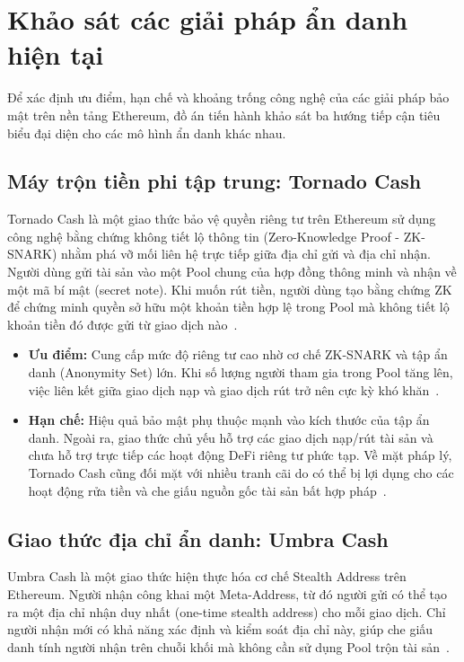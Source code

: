 \documentclass[../DoAn.tex]{subfiles}
\begin{document}
\section{Khảo sát các giải pháp ẩn danh hiện tại}
Để xác định ưu điểm, hạn chế và khoảng trống công nghệ của các giải pháp bảo mật trên nền tảng Ethereum, đồ án tiến hành khảo sát ba hướng tiếp cận tiêu biểu đại diện cho các mô hình ẩn danh khác nhau.

\subsection{Máy trộn tiền phi tập trung: Tornado Cash}

Tornado Cash là một giao thức bảo vệ quyền riêng tư trên Ethereum sử dụng công nghệ bằng chứng không tiết lộ thông tin (Zero-Knowledge Proof - ZK-SNARK) nhằm phá vỡ mối liên hệ trực tiếp giữa địa chỉ gửi và địa chỉ nhận. Người dùng gửi tài sản vào một Pool chung của hợp đồng thông minh và nhận về một mã bí mật (secret note). Khi muốn rút tiền, người dùng tạo bằng chứng ZK để chứng minh quyền sở hữu một khoản tiền hợp lệ trong Pool mà không tiết lộ khoản tiền đó được gửi từ giao dịch nào~\cite{tornado_docs}.

\begin{itemize}
\item \textbf{Ưu điểm:} Cung cấp mức độ riêng tư cao nhờ cơ chế ZK-SNARK và tập ẩn danh (Anonymity Set) lớn. Khi số lượng người tham gia trong Pool tăng lên, việc liên kết giữa giao dịch nạp và giao dịch rút trở nên cực kỳ khó khăn~\cite{tornado_docs}.


\item \textbf{Hạn chế:} Hiệu quả bảo mật phụ thuộc mạnh vào kích thước của tập ẩn danh. Ngoài ra, giao thức chủ yếu hỗ trợ các giao dịch nạp/rút tài sản và chưa hỗ trợ trực tiếp các hoạt động DeFi riêng tư phức tạp. Về mặt pháp lý, Tornado Cash cũng đối mặt với nhiều tranh cãi do có thể bị lợi dụng cho các hoạt động rửa tiền và che giấu nguồn gốc tài sản bất hợp pháp~\cite{tornado_docs}.


\end{itemize}

\subsection{Giao thức địa chỉ ẩn danh: Umbra Cash}

Umbra Cash là một giao thức hiện thực hóa cơ chế Stealth Address trên Ethereum. Người nhận công khai một Meta-Address, từ đó người gửi có thể tạo ra một địa chỉ nhận duy nhất (one-time stealth address) cho mỗi giao dịch. Chỉ người nhận mới có khả năng xác định và kiểm soát địa chỉ này, giúp che giấu danh tính người nhận trên chuỗi khối mà không cần sử dụng Pool trộn tài sản~\cite{umbra_docs,erc5564}.
\end{document}
